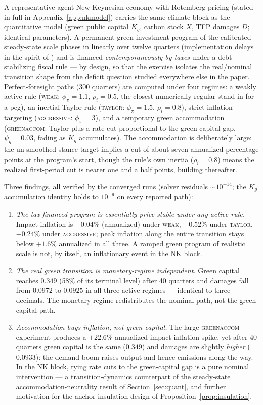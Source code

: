 \documentclass[12pt]{article}
\begin{document}
A representative-agent New Keynesian economy with Rotemberg pricing (stated
in full in Appendix~\ref{app:nkmodel}) carries
the same climate block as the quantitative model (green public capital
$K_g$, carbon stock $X$, TFP damages $D$; identical parameters). A
permanent green-investment program of the calibrated steady-state scale
phases in linearly over twelve quarters (implementation delays in the
spirit of \citet{leeperwalkeryang2010}) and is financed \emph{contemporaneously by
taxes} under a debt-stabilizing fiscal rule --- by design, so that the
exercise isolates the real/nominal transition shape from the deficit
question studied everywhere else in the paper. Perfect-foresight paths
(300 quarters) are computed under four regimes: a weakly active rule
(\textsc{weak}: $\phi_\pi=1.1$, $\rho_i=0.5$, the closest numerically
regular stand-in for a peg), an inertial Taylor rule (\textsc{taylor}:
$\phi_\pi=1.5$, $\rho_i=0.8$), strict inflation targeting
(\textsc{aggressive}: $\phi_\pi=3$), and a temporary green accommodation
(\textsc{greenaccom}: Taylor plus a rate cut proportional to the
green-capital gap, $\psi_g=0.03$, fading as $K_g$ accumulates). The
accommodation is deliberately large: the un-smoothed stance target implies
a cut of about seven annualized percentage points at the program's start,
though the rule's own inertia ($\rho_i=0.8$) means the realized first-period
cut is nearer one and a half points, building thereafter.

Three findings, all verified by the converged runs (solver residuals
$\sim 10^{-14}$; the $K_g$ accumulation identity holds to $10^{-9}$ on
every reported path):

\begin{enumerate}
\item \emph{The tax-financed program is essentially price-stable under any
active rule.} Impact inflation is $-0.04$\% (annualized) under
\textsc{weak}, $-0.52$\% under \textsc{taylor}, $-0.24$\% under
\textsc{aggressive}; peak inflation along the entire transition stays
below $+1.6$\% annualized in all three. A ramped green program of
realistic scale is not, by itself, an inflationary event in the NK block.
\item \emph{The real green transition is monetary-regime independent.}
Green capital reaches $0.349$ (58\% of its terminal level) after 40
quarters and damages fall from $0.0972$ to $0.0925$ in all three active
regimes --- identical to three decimals. The monetary regime redistributes
the nominal path, not the green capital path.
\item \emph{Accommodation buys inflation, not green capital.} The large
\textsc{greenaccom} experiment produces a $+22.6$\% annualized
impact-inflation spike, yet after 40 quarters green capital is the same
($0.349$) and damages are slightly \emph{higher} ($0.0933$): the
demand boom raises output and hence emissions along the way. In the NK
block, tying rate cuts to the green-capital gap is a pure nominal
intervention --- a transition-dynamics counterpart of the steady-state
accommodation-neutrality result of Section~\ref{sec:quant}, and further
motivation for the anchor-insulation design of
Proposition~\ref{prop:insulation}.
\end{enumerate}
\end{document}

